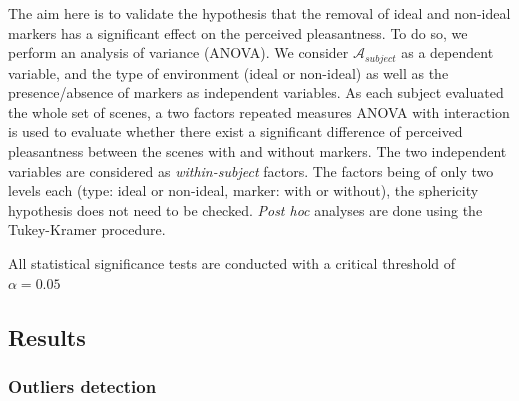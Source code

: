 \documentclass[12pt]{elsarticle}
\begin{document}
The aim here is to validate the hypothesis that the removal of ideal and non-ideal markers has a significant effect on the perceived pleasantness. To do so, we perform an analysis of variance (ANOVA). We consider $\mathcal{A}_{subject}$ as a dependent variable, and the type of environment (ideal or non-ideal) as well as the presence/absence of markers as independent variables. As each subject evaluated the whole set of scenes, a two factors repeated measures ANOVA with interaction is used to evaluate whether there exist a significant difference of perceived pleasantness between the scenes with and without markers. The two independent variables are considered as \emph{within-subject} factors. The factors being of only two levels each (type: ideal or non-ideal,  marker: with or without), the sphericity hypothesis does not need to be checked. \emph{Post hoc} analyses are done using the Tukey-Kramer procedure.


All statistical significance tests are conducted with a critical threshold of $\alpha=0.05$


\subsection{Results}

\subsubsection{Outliers detection}
\end{document}

